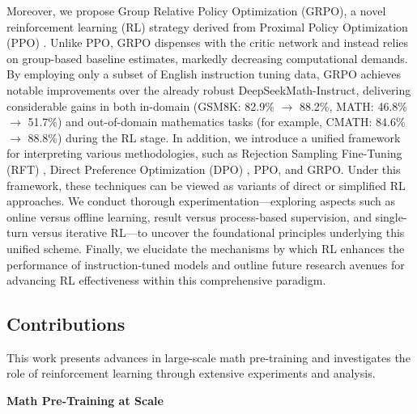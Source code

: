 Moreover, we propose Group Relative Policy Optimization (GRPO), a novel reinforcement learning (RL) strategy derived from Proximal Policy Optimization (PPO) \citep{schulman2017proximal}. Unlike PPO, GRPO dispenses with the critic network and instead relies on group-based baseline estimates, markedly decreasing computational demands. By employing only a subset of English instruction tuning data, GRPO achieves notable improvements over the already robust DeepSeekMath-Instruct, delivering considerable gains in both in-domain (GSM8K: 82.9\% $\rightarrow$ 88.2\%, MATH: 46.8\% $\rightarrow$ 51.7\%) and out-of-domain mathematics tasks (for example, CMATH: 84.6\% $\rightarrow$ 88.8\%) during the RL stage. In addition, we introduce a unified framework for interpreting various methodologies, such as Rejection Sampling Fine-Tuning (RFT) \citep{yuan2023scaling}, Direct Preference Optimization (DPO) \citep{dpo}, PPO, and GRPO. Under this framework, these techniques can be viewed as variants of direct or simplified RL approaches. We conduct thorough experimentation—exploring aspects such as online versus offline learning, result versus process-based supervision, and single-turn versus iterative RL—to uncover the foundational principles underlying this unified scheme. Finally, we elucidate the mechanisms by which RL enhances the performance of instruction-tuned models and outline future research avenues for advancing RL effectiveness within this comprehensive paradigm.

\subsection{Contributions}
This work presents advances in large-scale math pre-training and investigates the role of reinforcement learning through extensive experiments and analysis.

\textbf{Math Pre-Training at Scale}

